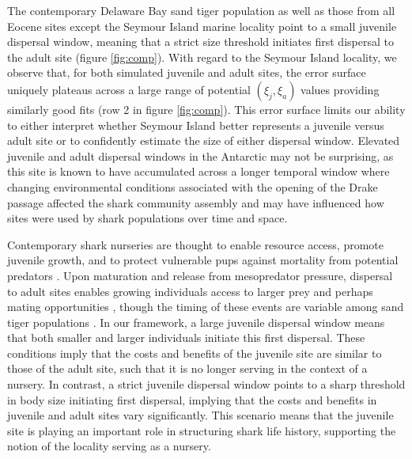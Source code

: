 \documentclass[]{rsos}%
\begin{document}
The contemporary Delaware Bay sand tiger population as well as those from all Eocene sites except the Seymour Island marine locality point to a small juvenile dispersal window, meaning that a strict size threshold initiates first dispersal to the adult site (figure \ref{fig:comp}).
With regard to the Seymour Island locality, we observe that, for both simulated juvenile and adult sites, the error surface uniquely plateaus across a large range of potential $(\xi_j,\xi_a)$ values providing similarly good fits (row 2 in figure \ref{fig:comp}).
This error surface limits our ability to either interpret whether Seymour Island better represents a juvenile versus adult site or to confidently estimate the size of either dispersal window.
Elevated juvenile and adult dispersal windows in the Antarctic may not be surprising, as this site is known to have accumulated across a longer temporal window \cite{montes2019late} where changing environmental conditions associated with the opening of the Drake passage \cite{Kim2020, zhu2020simulation} affected the shark community assembly \cite{Kriwet2016} and may have influenced how sites were used by shark populations over time and space.


Contemporary shark nurseries are thought to enable resource access, promote juvenile growth, and to protect vulnerable pups against mortality from potential predators \cite{Kneebone2012, heithaus2007nursery, heupel2007shark}.
Upon maturation and release from mesopredator pressure, dispersal to adult sites enables growing individuals access to larger prey and perhaps mating opportunities \cite{jorgensen2012eating}, though the timing of these events are variable among sand tiger populations \cite{Teter2015, kneebone2014movement, dicken2008estimates, otway2011pop}.
In our framework, a large juvenile dispersal window means that both smaller and larger individuals initiate this first dispersal.
These conditions imply that the costs and benefits of the juvenile site are similar to those of the adult site, such that it is no longer serving in the context of a nursery.
In contrast, a strict juvenile dispersal window points to a sharp threshold in body size initiating first dispersal, implying that the costs and benefits in juvenile and adult sites vary significantly.
This scenario means that the juvenile site is playing an important role in structuring shark life history, supporting the notion of the locality serving as a nursery.
\end{document}
